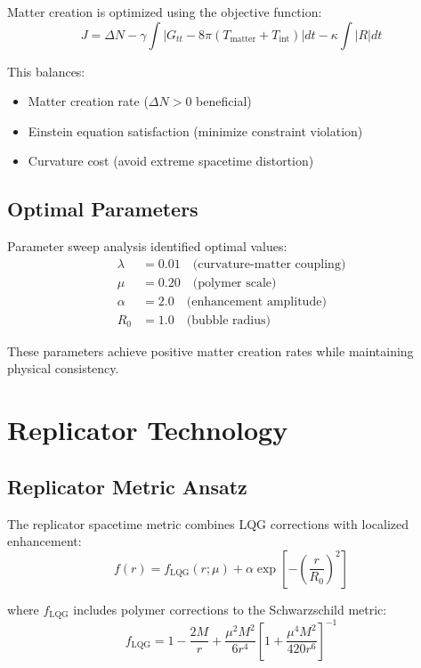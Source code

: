 \documentclass[11pt]{article}
\begin{document}
Matter creation is optimized using the objective function:
\begin{equation}
J = \Delta N - \gamma \int |G_{tt} - 8\pi(T_{\text{matter}} + T_{\text{int}})| dt - \kappa \int |R| dt
\end{equation}

This balances:
\begin{itemize}
\item Matter creation rate ($\Delta N > 0$ beneficial)
\item Einstein equation satisfaction (minimize constraint violation)
\item Curvature cost (avoid extreme spacetime distortion)
\end{itemize}

\subsection{Optimal Parameters}

Parameter sweep analysis identified optimal values:
\begin{align}
\lambda &= 0.01 \quad \text{(curvature-matter coupling)} \\
\mu &= 0.20 \quad \text{(polymer scale)} \\
\alpha &= 2.0 \quad \text{(enhancement amplitude)} \\
R_0 &= 1.0 \quad \text{(bubble radius)}
\end{align}

These parameters achieve positive matter creation rates while maintaining physical consistency.

\section{Replicator Technology}

\subsection{Replicator Metric Ansatz}

The replicator spacetime metric combines LQG corrections with localized enhancement:
\begin{equation}
f(r) = f_{\text{LQG}}(r;\mu) + \alpha \exp\left[-\left(\frac{r}{R_0}\right)^2\right]
\end{equation}

where $f_{\text{LQG}}$ includes polymer corrections to the Schwarzschild metric:
\begin{equation}
f_{\text{LQG}} = 1 - \frac{2M}{r} + \frac{\mu^2 M^2}{6r^4}\left[1 + \frac{\mu^4 M^2}{420r^6}\right]^{-1}
\end{equation}
\end{document}
